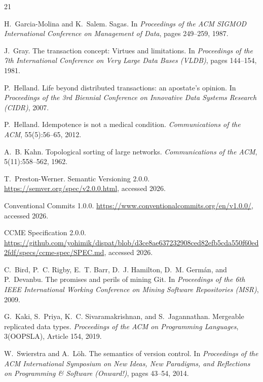 \documentclass[sigconf,nonacm]{acmart}
\begin{document}
\vfuzz=2pt
\begin{thebibliography}{21}

H.~Garcia-Molina and K.~Salem.
Sagas.
In \emph{Proceedings of the ACM SIGMOD International Conference on
Management of Data}, pages 249--259, 1987.

J.~Gray.
The transaction concept: Virtues and limitations.
In \emph{Proceedings of the 7th International Conference on Very Large
Data Bases (VLDB)}, pages 144--154, 1981.

P.~Helland.
Life beyond distributed transactions: an apostate's opinion.
In \emph{Proceedings of the 3rd Biennial Conference on Innovative Data
Systems Research (CIDR)}, 2007.

P.~Helland.
Idempotence is not a medical condition.
\emph{Communications of the ACM}, 55(5):56--65, 2012.

A.~B. Kahn.
Topological sorting of large networks.
\emph{Communications of the ACM}, 5(11):558--562, 1962.

T.~Preston-Werner.
Semantic Versioning 2.0.0.
\url{https://semver.org/spec/v2.0.0.html}, accessed 2026.

Conventional Commits 1.0.0.
\url{https://www.conventionalcommits.org/en/v1.0.0/}, accessed 2026.

CCME Specification 2.0.0.
\url{https://github.com/yohimik/dispat/blob/d3ce8ae637232908ced82efb5cda550f60ed2fdf/specs/ccme-spec/SPEC.md},
accessed 2026.

C.~Bird, P.~C. Rigby, E.~T. Barr, D.~J. Hamilton, D.~M. Germ\'an, and
P.~Devanbu.
The promises and perils of mining Git.
In \emph{Proceedings of the 6th IEEE International Working Conference
on Mining Software Repositories (MSR)}, 2009.

G.~Kaki, S.~Priya, K.~C. Sivaramakrishnan, and S.~Jagannathan.
Mergeable replicated data types.
\emph{Proceedings of the ACM on Programming Languages},
3(OOPSLA), Article 154, 2019.

W.~Swierstra and A.~L\"oh.
The semantics of version control.
In \emph{Proceedings of the ACM International Symposium on New Ideas,
New Paradigms, and Reflections on Programming \& Software (Onward!)},
pages 43--54, 2014.


\end{thebibliography}
\end{document}
